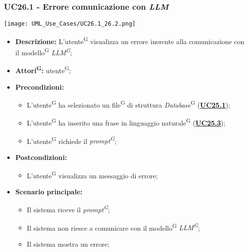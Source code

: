 \subsubsection{UC26.1 - Errore comunicazione con \textit{LLM}}
\label{sec:UC26.1}
\texttt{[image: UML\_Use\_Cases/UC26.1\_26.2.png]}
\begin{itemize}
	\item \textbf{Descrizione:} L’utente\textsuperscript{G} visualizza un errore inerente alla comunicazione con il modello\textsuperscript{G} \textit{LLM\textsuperscript{G}};
	\item \textbf{Attori\textsuperscript{G}:} utente\textsuperscript{G};
	\item \textbf{Precondizioni:} 
	\begin{itemize}
		\item L’utente\textsuperscript{G} ha selezionato un file\textsuperscript{G} di struttura \textit{Database}\textsuperscript{G} (\hyperref[sec:UC25.1]{\textbf{UC25.1}});
		\item L’utente\textsuperscript{G} ha inserito una frase in linguaggio naturale\textsuperscript{G} (\hyperref[sec:UC25.3]{\textbf{UC25.3}});
		\item L’utente\textsuperscript{G} richiede il \textit{prompt\textsuperscript{G}};
	\end{itemize}
	\item \textbf{Postcondizioni:} 
	\begin{itemize}
		\item L’utente\textsuperscript{G} visualizza un messaggio di errore;
	\end{itemize}
	\item \textbf{Scenario principale:} 
	\begin{itemize}
		\item Il sistema riceve il \textit{prompt\textsuperscript{G}};
		\item Il sistema non riesce a comunicare con il modello\textsuperscript{G} \textit{LLM\textsuperscript{G}};
		\item Il sistema mostra un errore;
	\end{itemize}
\end{itemize}

